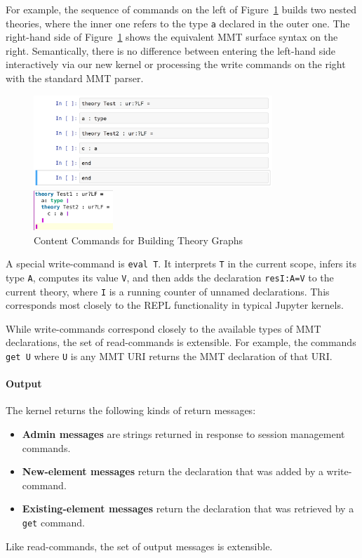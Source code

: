 For example, the sequence of commands on the left of Figure~\ref{fig:test_theory} builds two nested theories, where the inner one refers to the type \texttt{a} declared in the outer one.
The right-hand side of Figure~\ref{fig:test_theory} shows the equivalent MMT surface syntax on the right.
Semantically, there is no difference between entering the left-hand side interactively via our new kernel or processing the write commands on the right with the standard MMT parser.
\begin{figure}[ht]\centering
\begin{minipage}[c]{9cm}\includegraphics[width=9cm]{../D4.11/test_theory_jupyter}\end{minipage}
\begin{minipage}[c]{3cm}\includegraphics[width=3cm]{../D4.11/test_theory}\end{minipage}
\caption{Content Commands for Building Theory Graphs}\label{fig:test_theory}
\end{figure}

A special write-command is \texttt{eval T}.
It interprets \texttt{T} in the current scope, infers its type \texttt{A}, computes its value \texttt{V}, and then adds the declaration \texttt{resI:A=V} to the current theory, where \texttt{I} is a running counter of unnamed declarations.
This corresponds most closely to the REPL functionality in typical Jupyter kernels.

While write-commands correspond closely to the available types of MMT declarations, the set of read-commands is extensible.
For example, the commands \texttt{get U} where \texttt{U} is any MMT URI returns the MMT declaration of that URI.

\paragraph{Output}
The kernel returns the following kinds of return messages:
\begin{itemize}
\item \textbf{Admin messages} are strings returned in response to session management commands.
\item \textbf{New-element messages} return the declaration that was added by a write-command.
\item \textbf{Existing-element messages} return the declaration that was retrieved by a \texttt{get} command.
\end{itemize}
Like read-commands, the set of output messages is extensible.

